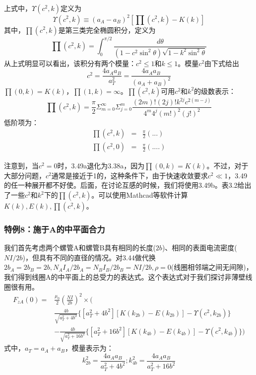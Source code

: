 上式中，$\Upsilon(c^2,k)$定义为
\begin{equation}
  \Upsilon(c^2,k)\equiv(a_A-a_B)^2[\prod(c^2,k)-K(k)]
\end{equation}
其中，$\prod(c^2,k)$是第三类完全椭圆积分，定义为
\begin{equation}
\prod(c^2,k)=\int_{0}^{\pi/2}\frac{d\theta}{(1-c^2\sin^2\theta)\sqrt{1-k^2\sin^2\theta}}
\end{equation}
从上式明显可以看出，该积分有两个模量：$c^2\le 1$和$k\le 1$。模量$c^2$由下式给出
\begin{equation}
c^2=\frac{4a_A a_B}{a_T^2}=\frac{4a_A a_B}{(a_A+a_B)^2}
\end{equation}
$\prod(0,k)=K(k)$，$\prod(1,k)=\infty$。$\prod(c^2,k)$可用$c^2$和$k^2$的级数表示：
\begin{equation}
\prod(c^2,k)=\frac{\pi}{2}\Sigma_{m=0}^{\infty} \Sigma_{j=0}^{m} \frac{(2m)!(2j)!k^{2j}c^{2(m-j)}}{4^m 4^j (m!)^2(j!)^2}
\end{equation}
低阶项为：
\begin{eqnarray}
  \prod(c^2,k) &=& \frac{\pi}{2}(...) \\ \nonumber
  \prod(c^2,0) &=& \frac{\pi}{2}(....)
\end{eqnarray}

注意到，当$c^2=0$时，3.49a退化为3.38a，因为$\prod(0,k)=K(k)$。不过，对于大部分问题，$c^2$通常是接近于1的，这种条件下，由于快速收敛要求$c^2\ll 1$，3.49的任一种展开都不好使。后面，在讨论互感的时候，我们将使用3.49b。表3.2给出了一些$c^2$和$k^2$下的$\prod(c^2,k)$。可以使用Mathcad等软件计算$K(k),E(k),\prod(c^2,k)$。

\subsubsection{特例8：施于A的中平面合力}
我们首先考虑两个螺管A和螺管B具有相同的长度($2b$)、相同的表面电流密度($NI/2b$)，但具有不同的直径的情况。对3.44做代换$2b_A = 2b_B = 2b, N_A I_A/2b_A = N_B I_B/2b_B = N I/2b,\rho=0$(线圈相邻端之间无间隙)，我们得到线圈A的中平面上的总受力的表达式。这个表达式对于我们探讨非薄壁线圈很有用。
\begin{equation}
\begin{split}
F_{zA}(0)=&\frac{\mu_0}{2}(\frac{NI}{2b})^2\times(  \\
&\frac{4b}{\sqrt{a_T^2+4b^2}} \{[a_T^2+4b^2][K(k_{2b})-E(k_{2b})]-\Upsilon(c^2,k_{2b}) \}\\
&-\frac{4b}{\sqrt{a_T^2+16b^2}} \{[a_T^2+16b^2][K(k_{4b})-E(k_{4b})]-\Upsilon(c^2,k_{4b}) \} )
\end{split}
\end{equation}
式中，$a_T=a_A+a_B$，模量表示为：
$$k_{2b}^2=\frac{4a_A a_B}{a_T^2+4b^2} ; k_{4b}^2=\frac{4a_A a_B}{a_T^2+16b^2} $$

